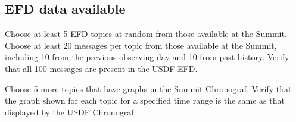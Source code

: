 \subsection{EFD data available }
Choose at least 5 EFD topics at random from those available at the Summit.
Choose at least 20 messages per topic from those available at the Summit, including 10 from the previous observing day and 10 from past history.
Verify that all 100 messages are present in the USDF EFD.

Choose 5 more topics that have graphs in the Summit Chronograf.
Verify that the graph shown for each topic for a specified time range is the same as that displayed by the USDF Chronograf.
